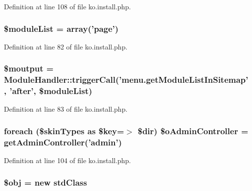 Definition at line 108 of file ko.\+install.\+php.

\hypertarget{ko_8install_8php_aaa80946d50e2d3677fbbc6d6c8a643c3}{
\subsubsection[{\$module\+List}]{\setlength{\rightskip}{0pt plus 5cm}\$module\+List = array('{\bf page}')}}\label{ko_8install_8php_aaa80946d50e2d3677fbbc6d6c8a643c3}


Definition at line 82 of file ko.\+install.\+php.

\hypertarget{ko_8install_8php_a2598d068355cca17645bc6bd70cc3a8c}{
\subsubsection[{\$moutput}]{\setlength{\rightskip}{0pt plus 5cm}\$moutput = {\bf Module\+Handler\+::trigger\+Call}('menu.\+get\+Module\+List\+In\+Sitemap', 'after', \$module\+List)}}\label{ko_8install_8php_a2598d068355cca17645bc6bd70cc3a8c}


Definition at line 83 of file ko.\+install.\+php.

\hypertarget{ko_8install_8php_a4e2098076e50f24dd86e1062844d25d5}{
\subsubsection[{\$o\+Admin\+Controller}]{\setlength{\rightskip}{0pt plus 5cm}foreach (\$skin\+Types as \$key=$>$ \$dir) \$o\+Admin\+Controller = {\bf get\+Admin\+Controller}('{\bf admin}')}}\label{ko_8install_8php_a4e2098076e50f24dd86e1062844d25d5}


Definition at line 104 of file ko.\+install.\+php.

\hypertarget{ko_8install_8php_a9008ed94ba185855b1723e367744b87e}{
\subsubsection[{\$obj}]{\setlength{\rightskip}{0pt plus 5cm}\$obj = new std\+Class}}\label{ko_8install_8php_a9008ed94ba185855b1723e367744b87e}


